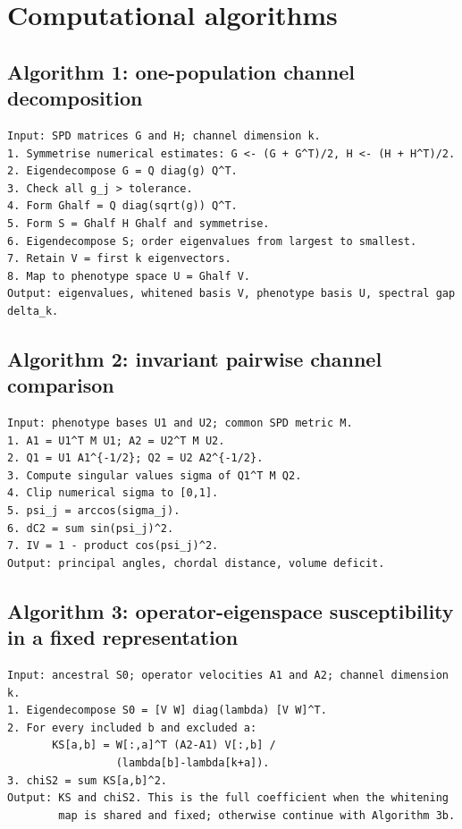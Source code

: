 \chapter{Computational algorithms}

\section{Algorithm 1: one-population channel decomposition}

\begin{lstlisting}
Input: SPD matrices G and H; channel dimension k.
1. Symmetrise numerical estimates: G <- (G + G^T)/2, H <- (H + H^T)/2.
2. Eigendecompose G = Q diag(g) Q^T.
3. Check all g_j > tolerance.
4. Form Ghalf = Q diag(sqrt(g)) Q^T.
5. Form S = Ghalf H Ghalf and symmetrise.
6. Eigendecompose S; order eigenvalues from largest to smallest.
7. Retain V = first k eigenvectors.
8. Map to phenotype space U = Ghalf V.
Output: eigenvalues, whitened basis V, phenotype basis U, spectral gap delta_k.
\end{lstlisting}

\section{Algorithm 2: invariant pairwise channel comparison}

\begin{lstlisting}
Input: phenotype bases U1 and U2; common SPD metric M.
1. A1 = U1^T M U1; A2 = U2^T M U2.
2. Q1 = U1 A1^{-1/2}; Q2 = U2 A2^{-1/2}.
3. Compute singular values sigma of Q1^T M Q2.
4. Clip numerical sigma to [0,1].
5. psi_j = arccos(sigma_j).
6. dC2 = sum sin(psi_j)^2.
7. IV = 1 - product cos(psi_j)^2.
Output: principal angles, chordal distance, volume deficit.
\end{lstlisting}

\section{Algorithm 3: operator-eigenspace susceptibility in a fixed representation}

\begin{lstlisting}
Input: ancestral S0; operator velocities A1 and A2; channel dimension k.
1. Eigendecompose S0 = [V W] diag(lambda) [V W]^T.
2. For every included b and excluded a:
       KS[a,b] = W[:,a]^T (A2-A1) V[:,b] /
                 (lambda[b]-lambda[k+a]).
3. chiS2 = sum KS[a,b]^2.
Output: KS and chiS2. This is the full coefficient when the whitening
        map is shared and fixed; otherwise continue with Algorithm 3b.
\end{lstlisting}

